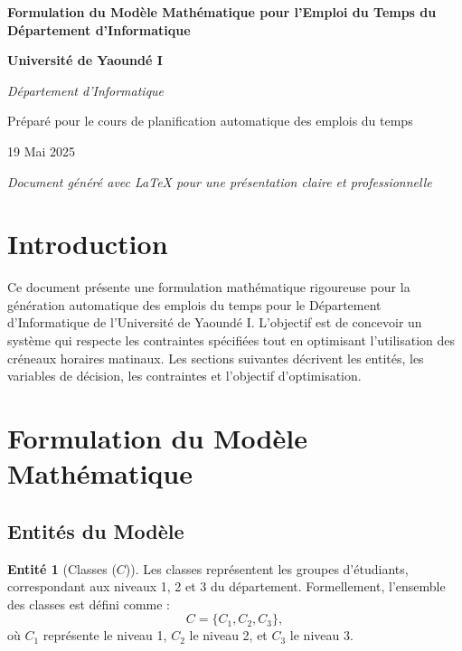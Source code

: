 \documentclass[11pt, a4paper]{article}
\theoremstyle{definition}
\newtheorem{entite}{Entité}
\begin{document}
\begin{titlepage}
    \centering
    \vspace*{2cm}
    {\color{titleblue}\Huge\bfseries Formulation du Modèle Mathématique pour l'Emploi du Temps du Département d'Informatique\par}
    \vspace{1.5cm}
    {\Large\bfseries Université de Yaoundé I\par}
    \vspace{1cm}
    {\large\itshape Département d'Informatique\par}
    \vspace{2cm}
    {\normalsize Préparé pour le cours de planification automatique des emplois du temps\par}
    \vspace{0.5cm}
    {\normalsize 19 Mai 2025\par}
    \vfill
    {\large\itshape Document généré avec LaTeX pour une présentation claire et professionnelle\par}
\end{titlepage}

\section{Introduction}

Ce document présente une formulation mathématique rigoureuse pour la génération automatique des emplois du temps pour le Département d'Informatique de l'Université de Yaoundé I. L'objectif est de concevoir un système qui respecte les contraintes spécifiées tout en optimisant l'utilisation des créneaux horaires matinaux. Les sections suivantes décrivent les entités, les variables de décision, les contraintes et l'objectif d'optimisation.

\section{Formulation du Modèle Mathématique}

\subsection{Entités du Modèle}

\begin{entite}[Classes ($C$)]
Les classes représentent les groupes d'étudiants, correspondant aux niveaux 1, 2 et 3 du département. Formellement, l'ensemble des classes est défini comme :
\[
C = \{C_1, C_2, C_3\},
\]
où \( C_1 \) représente le niveau 1, \( C_2 \) le niveau 2, et \( C_3 \) le niveau 3.
\end{entite}
\end{document}
